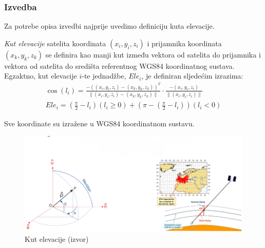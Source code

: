 \documentclass[a4paper,twoside,12pt]{memoir} %
\begin{document}
\subsubsection{Izvedba}
Za potrebe opisa izvedbi najprije uvedimo definiciju kuta elevacije.
\begin{defn}
	\textit{Kut elevacije} satelita koordinata $(x_i,y_i,z_i)$ i prijamnika koordinata $(x_k,y_k,z_k)$ se definira kao manji kut između vektora od satelita do prijamnika i vektora 
	od satelita do središta referentnog WGS84 koordinatnog sustava.
	Egzaktno, kut elevacije $i$-te jednadžbe, $Ele_i$, je definiran sljedećim izrazima:
	\begin{align}\label{eq:elevation}
	\cos (l_i) = \frac{-((x_i,y_i,z_i)-(x_k,y_k,z_k))^T}{\| (x_i,y_i,z_i)-(x_k,y_k,z_k) \|} \cdot \frac{-(x_i,y_i,z_i)}{\| (x_i,y_i,z_i) \|} \\
	Ele_i = \left(\frac{\pi}{2}-l_i \right)\left(l_i \geq 0 \right) + \left(\pi - \left(\frac{\pi}{2}-l_i \right) \right)(l_i < 0)
	\end{align}
	
	Sve koordinate su izražene u WGS84 koordinatnom sustavu.
\end{defn}
\begin{figure}[H]
	\begin{minipage}{0.9\textwidth}
		\centering
		\includegraphics[width=1\textwidth]{elev}
		\caption{Kut elevacije (izvor)}
		\label{fig:elev}
	\end{minipage}
\end{figure}%
\end{document}
